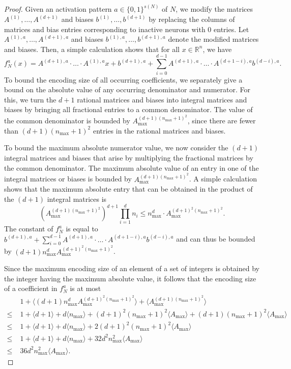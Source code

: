 \documentclass{article}
\begin{document}
\begin{proof}
    Given an activation pattern $a\in \{0,1\}^{s(N)}$ of $N$, we modify the matrices $A^{(1)},\dots, A^{(d+1)}$ and biases $b^{(1)},\dots, b^{(d+1)}$ by replacing the columns of matrices and bias entries corresponding to inactive neurons with 0 entries.
    Let $A^{(1),a},\dots, A^{(d+1),a}$ and biases $b^{(1),a},\dots, b^{(d+1), a}$ denote the modified matrices and biases.
    Then, a simple calculation shows that for all $x\in \mathbb{R}^n$, we have
    \[
    f_N^a(x) = A^{(d+1),a}\cdot \dots \cdot A^{(1),a}x + b^{(d+1), a}+\sum_{i=0}^{d-1}A^{(d+1),a}\cdot \dots \cdot A^{(d+1-i),a}b^{(d-i), a}.
    \]
    To bound the encoding size of all occurring coefficients, we separately give a bound on the absolute value of any occurring denominator and numerator.
    For this, we turn the $d+1$ rational matrices and biases into integral matrices and biases by bringing all fractional entries to a common denominator.
    The value of the common denominator is bounded by $A_{\max}^{(d+1)(n_{\max}+1)^2}$, since there are fewer than $(d+1)(n_{\max}+1)^2$ entries in the rational matrices and biases.

    To bound the maximum absolute numerator value, we now consider the $(d+1)$ integral matrices and biases that arise by multiplying the fractional matrices by the common denominator.
    The maximum absolute value of an entry in one of the integral matrices or biases is bounded by $A_{\max}^{(d+1)(n_{\max}+1)^2}$.
    A simple calculation shows that the maximum absolute entry that can be obtained in the product of the $(d+1)$ integral matrices is
    \[
    \left(A_{\max}^{(d+1)(n_{\max}+1)^2}\right)^{d+1}\prod_{i=1}^{d}n_i
    \leq n_{\max}^d \cdot A_{\max}^{(d+1)^2(n_{\max}+1)^2}.
    \]
    The constant of $f_N^a$ is equal to $b^{(d+1), a}+\sum_{i=0}^{d-1}A^{(d+1),a}\cdot \dots \cdot A^{(d+1-i),a}b^{(d-i), a}$ and can thus be bounded by $(d+1) n_{\max}^d  A_{\max}^{(d+1)^2(n_{\max}+1)^2}$.
    
    Since the maximum encoding size of an element of a set of integers is obtained by the integer having the maximum absolute value, it follows that the encoding size of a coefficient in $f_N^a$ is at most
    \begin{align*}
    &1+\langle (d+1) n_{\max}^d  A_{\max}^{(d+1)^2(n_{\max}+1)^2} \rangle + \langle A_{\max}^{(d+1)(n_{\max}+1)^2} \rangle\\
    \leq\;&1+\langle d + 1 \rangle+d\langle n_{\max}\rangle+(d+1)^2(n_{\max}+1)^2\langle A_{\max}\rangle+(d+1)(n_{\max}+1)^2\langle A_{\max}\rangle\\
    \leq\;&1+\langle d + 1 \rangle+d\langle n_{\max}\rangle+2(d+1)^2(n_{\max}+1)^2\langle A_{\max}\rangle\\
    \leq\;&1+\langle d + 1 \rangle+d\langle n_{\max}\rangle+32d^2n_{\max}^2\langle A_{\max}\rangle\\
    \leq \; & 36d^2n_{\max}^2\langle A_{\max}\rangle.
    \end{align*}
\end{proof}
\end{document}
